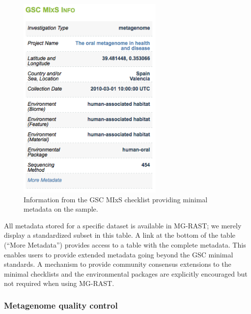 \documentclass[12pt,fullpage]{report}
\begin{document}
\begin{figure}
\begin{center}
\includegraphics[width=2.8in]{Images/GSC-MIxS-checklist-information.png}
\end{center}
\caption{
Information from the GSC MIxS checklist providing minimal metadata on the sample.
}
\label{fig:GSC-MIxS-checklist-information}
\end{figure}

All metadata stored for a specific dataset is available in MG-RAST; we merely display a standardized subset in this table. A link at the bottom of the table (``More Metadata'') provides access to a table with the complete metadata. This enables users to provide extended metadata going beyond the GSC minimal standards. A mechanism to provide community consensus extensions to the minimal checklists and the environmental packages are explicitly encouraged but not required when using MG-RAST.
\subsubsection{Metagenome quality control}
\end{document}
